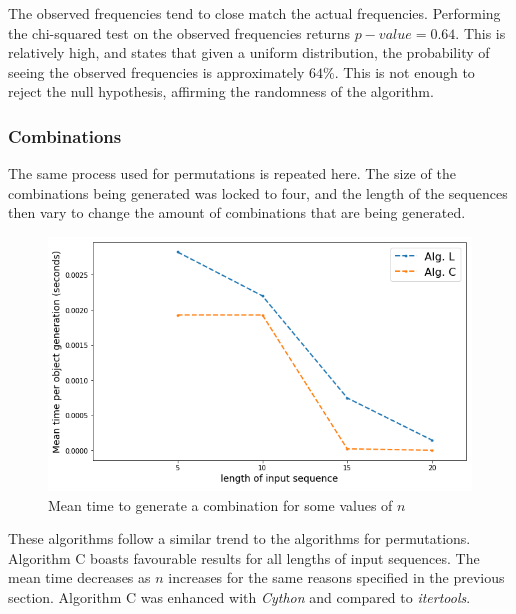 \documentclass[12pt]{article}
\begin{document}
\pagebreak

The observed frequencies tend to close match the actual frequencies. Performing the chi-squared test on the observed frequencies returns \(p-value=0.64\). This is relatively high, and states that given a uniform distribution, the probability of seeing the observed frequencies is approximately \(64\%\). This is not enough to reject the null hypothesis, affirming the randomness of the algorithm.

\subsubsection{Combinations}
The same process used for permutations is repeated here. The size of the combinations being generated was locked to four, and the length of the sequences then vary to change the amount of combinations that are being generated.

\begin{figure}[h]
\centering
\includegraphics[width=1.0\textwidth]{images/comb_graph1.PNG}
\caption{Mean time to generate a combination for some values of \(n\)}
\end{figure}

\pagebreak

These algorithms follow a similar trend to the algorithms for permutations. Algorithm C boasts favourable results for all lengths of input sequences. The mean time decreases as \(n\) increases for the same reasons specified in the previous section. Algorithm C was enhanced with \textit{Cython} and compared to \textit{itertools}.
\end{document}

